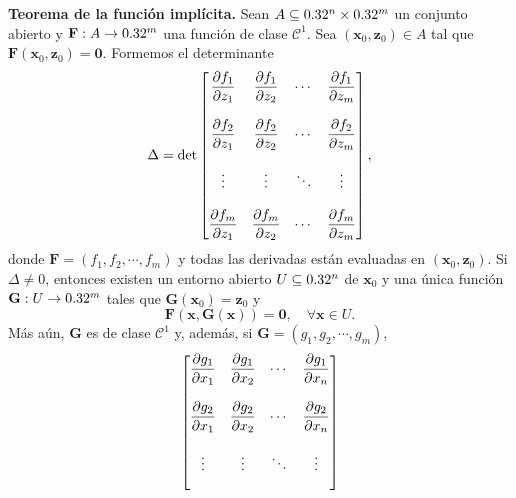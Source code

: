 \begin{theorem}\textbf{Teorema de la funci\'on impl\'icita.} \label{teo:implicit}  Sean $A  \subseteq  0.32^n \times 0.32^m$ un conjunto abierto y $\mathbf{F}: A \to 0.32^m$ una funci\'on de clase $\mathcal{C}^1$. Sea $(\mathbf{x}_0,\mathbf{z}_0) \in A$ tal que $\mathbf{F}(\mathbf{x}_0,\mathbf{z}_0) = \mathbf{0}$. Formemos el determinante
 \[
  \Delta = \det \begin{bmatrix} 
                \dfrac{\partial f_1}{\partial z_1} & \dfrac{\partial f_1}{\partial z_2} & \cdots & \dfrac{\partial f_1}{\partial z_m} \\
                               &                &        &                \\
                \dfrac{\partial f_2}{\partial z_1} & \dfrac{\partial f_2}{\partial z_2} & \cdots & \dfrac{\partial f_2}{\partial z_m} \\
                               &                &        &                \\
                \vdots         &  \vdots        & \ddots & \vdots         \\
                               &                &        &                \\
                \dfrac{\partial f_m}{\partial z_1} & \dfrac{\partial f_m}{\partial z_2} & \cdots & \dfrac{\partial f_m}{\partial z_m}
                \end{bmatrix},
 \]
 donde $\mathbf{F} = (f_1, f_2, \cdots , f_m)$ y todas las derivadas est\'an evaluadas en $(\mathbf{x}_0,\mathbf{z}_0)$. Si $\Delta \ne 0$, entonces existen un entorno abierto $U  \subseteq  0.32^n$ de $\mathbf{x}_0$
 y una \'unica funci\'on $\mathbf{G}: U \to 0.32^m$ tales que $\mathbf{G}(\mathbf{x}_0) = \mathbf{z}_0$ y
 \[
  \mathbf{F}(\mathbf{x},\mathbf{G}(\mathbf{x})) = \mathbf{0},\quad \forall \mathbf{x} \in U.
 \]
 M\'as a\'un, $\mathbf{G}$ es de clase $\mathcal{C}^1$ y, adem\'as, si $\mathbf{G} = (g_1, g_2, \cdots , g_m)$,
 \[
  \begin{bmatrix} 
                \dfrac{\partial g_1}{\partial x_1} & \dfrac{\partial g_1}{\partial x_2} & \cdots & \dfrac{\partial g_1}{\partial x_n} \\
                               &                &        &                \\
                \dfrac{\partial g_2}{\partial x_1} & \dfrac{\partial g_2}{\partial x_2} & \cdots & \dfrac{\partial g_2}{\partial x_n} \\
                               &                &        &                \\
                 \vdots         &  \vdots        & \ddots & \vdots         \\
                               &                &        &                \\

\end{bmatrix}\]
\end{theorem}
